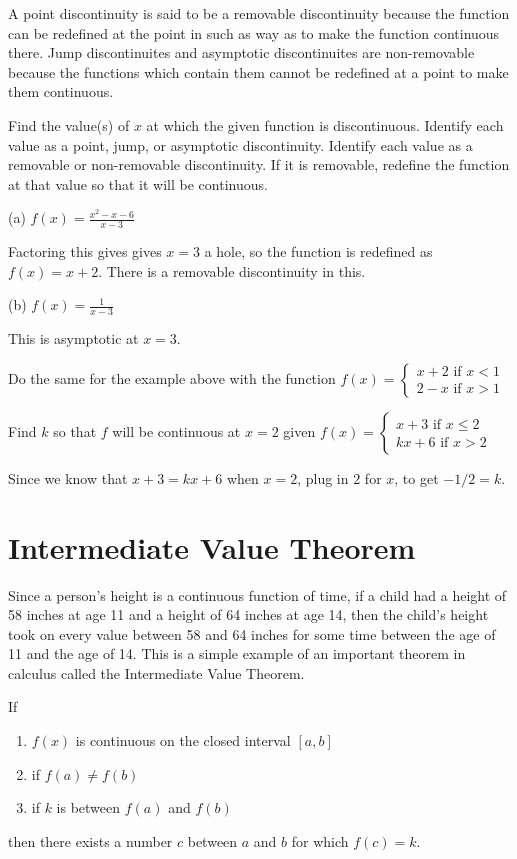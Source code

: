 \documentclass[../bccalc.tex]{subfiles}
\begin{document}
A point discontinuity is said to be a removable discontinuity because the function can be redefined at the point in such as way as to make the function continuous there.
Jump discontinuites and asymptotic discontinuites are non-removable because the functions which contain them cannot be redefined at a point to make them continuous.

\begin{example}
    Find the value(s) of $x$ at which the given function is discontinuous. Identify each value as a point, jump, or asymptotic discontinuity. Identify each value as a removable or non-removable discontinuity. If it is removable, redefine the function at that value so that it will be continuous.

    (a) $f(x)=\frac{x^2-x-6}{x-3}$

    Factoring this gives gives $x=3$ a hole, so the function is redefined as $f(x)=x+2$. There is a removable discontinuity in this.

    (b) $f(x)=\frac{1}{x-3}$

    This is asymptotic at $x=3$.
\end{example}

\ex Do the same for the example above with the function $f(x)=\begin{cases}
    x+2 \text{ if } x<1\\
    2-x \text{ if } x>1
\end{cases}$

\begin{example}
    Find $k$ so that $f$ will be continuous at $x=2$ given $f(x)=\begin{cases}
        x+3 \text{ if } x\leq 2 \\
        kx+6 \text{ if }x>2
    \end{cases}$

    Since we know that $x+3=kx+6$ when $x=2$, plug in $2$ for $x$, to get $-1/2=k$.
\end{example}

\section{Intermediate Value Theorem}
Since a person's height is a continuous function of time, if a child had a height of 58 inches at age 11 and a height of 64 inches at age 14, then the child's height took on every value between 58 and 64 inches for some time between the age of 11 and the age of 14. This is a simple example of an important theorem in calculus called the Intermediate Value Theorem.
\begin{theorem}
    If \begin{enumerate}
        \item $f(x)$ is continuous on the closed interval $[a,b]$
        \item if $f(a)\neq f(b)$
        \item if $k$ is between $f(a)$ and $f(b)$
    \end{enumerate}
    then there exists a number $c$ between $a$ and $b$ for which $f(c)=k$.
\end{theorem}
\end{document}
